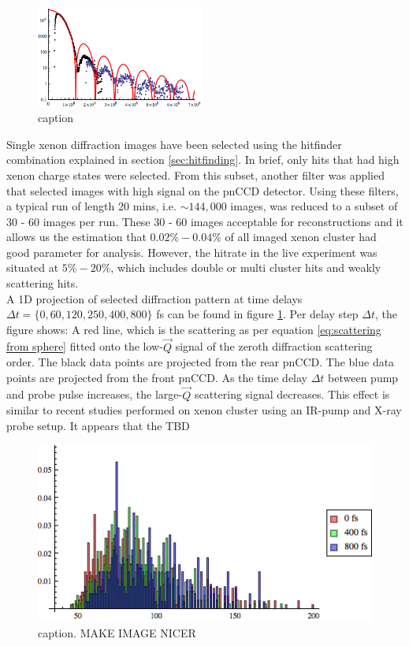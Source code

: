 \begin{figure}
		\includegraphics[width=0.49\textwidth]{images/results/Xe-only-800fs.png}
	\caption{caption}
	\label{fig:Xe-only-diff-pattern}
\end{figure}
Single xenon diffraction images have been selected using the hitfinder combination explained in section \ref{sec:hitfinding}. In brief, only hits that had high xenon charge states were selected. From this subset, another filter was applied that selected images with high signal on the pnCCD detector. Using these filters, a typical run of length 20 mins, i.e. $\sim 144,000$ images, was reduced to a subset of 30 - 60 images per run. These 30 - 60 images acceptable for reconstructions and it allows us the estimation that $0.02\% - 0.04\%$ of all imaged xenon cluster had good parameter for analysis. However, the hitrate in the live experiment was situated at $5\%-20\%$, which includes double or multi cluster hits and weakly scattering hits.\\
A 1D projection of selected diffraction pattern at time delays $\Delta t= \{0, 60, 120, 250, 400, 800\}$ fs can be found in figure \ref{fig:Xe-only-diff-pattern}. Per delay step $\Delta t$, the figure shows: A red line, which is the scattering as per equation \eqref{eq:scattering from sphere} fitted onto the low-$\vec{Q}$ signal of the zeroth diffraction scattering order. The black data points are projected from the rear pnCCD. The blue data points are projected from the front pnCCD. As the time delay $\Delta t$ between pump and probe pulse increases, the large-$\vec{Q}$ scattering signal decreases. This effect is similar to recent studies \citep{Gorkhover-2016-NatPho} performed on xenon cluster using an IR-pump and X-ray probe setup. It appears that the TBD\\
\begin{figure}
	\centering
		\includegraphics[width=1.00\textwidth]{images/size-distributions.png}
	\caption{caption. MAKE IMAGE NICER}
	\label{fig:size-distributions}
\end{figure}
